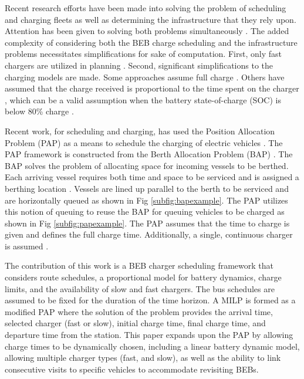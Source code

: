 \documentclass[letterpaper, 10pt, conference]{IEEEtran}
\begin{document}
Recent research efforts have been made into solving the problem of scheduling and charging fleets as well as determining the infrastructure that they rely upon. Attention has been given to solving both problems simultaneously \cite{Wei2018, Sebastiani2016, Hoke2014, Wang2017}.  The added complexity of considering both the BEB charge scheduling and the infrastructure problems necessitates simplifications for sake of computation. First, only fast chargers are utilized in planning \cite{Wei2018, Sebastiani2016, Wang2017, Zhou2020, Liu2020, Yang2018, Wang2017a, Qin2016}. Second, significant simplifications to the charging models are made. Some approaches assume full charge \cite{Wei2018, Wang2017, Zhou2020, Wang2017a}. Others have assumed that the charge received is proportional to the time spent on the charger \cite{Liu2020, Yang2018}, which can be a valid assumption when the battery state-of-charge (SOC) is below 80\% charge \cite{Liu2020}.

Recent work, for scheduling and charging, has used the Position Allocation Problem (PAP) as a means to schedule the charging of electric vehicles \cite{Qarebagh2019}. The PAP framework is constructed from the Berth Allocation Problem (BAP) \cite{Qarebagh2019}. The BAP solves the problem of allocating space for incoming vessels to be berthed. Each arriving vessel requires both time and space to be serviced and is assigned a berthing location \cite{Imai2001}. Vessels are lined up parallel to the berth to be serviced and are horizontally queued as shown in Fig \ref{subfig:bapexample}. The PAP utilizes this notion of queuing to reuse the BAP for queuing vehicles to be charged as shown in Fig \ref{subfig:papexample}. The PAP assumes that the time to charge is given and defines the full charge time. Additionally, a single, continuous charger is assumed \cite{Qarebagh2019}.

The contribution of this work is a BEB charger scheduling framework that considers route schedules, a proportional model for battery dynamics, charge limits, and the availability of slow and fast chargers. The bus schedules are assumed to be fixed for the duration of the time horizon. A MILP is formed as a modified PAP \cite{Qarebagh2019} where the solution of the problem provides the arrival time, selected charger (fast or slow), initial charge time, final charge time, and departure time from the station. This paper expands upon the PAP by allowing charge times to be dynamically chosen, including a linear battery dynamic model, allowing multiple charger types (fast, and slow), as well as the ability to link consecutive visits to specific vehicles to accommodate revisiting BEBs.
\end{document}
